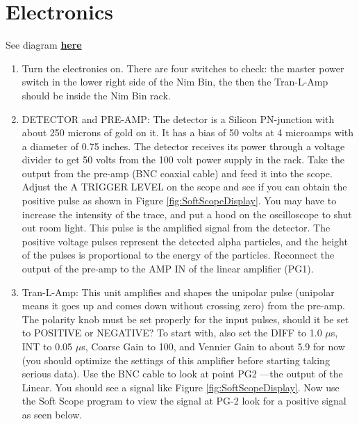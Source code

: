 \documentclass{../lab}
\begin{document}
\section{Electronics}

See diagram \href{http://physics111.lib.berkeley.edu/Physics111/Reprints/RUT/RUT_Positive-diagram.JPG}{\textbf{here}}

\begin{enumerate}
    \item Turn the electronics on. There are four switches to check: the master power switch in the lower right side of the Nim Bin, the then the Tran-L-Amp should be inside the Nim Bin rack.

    \item DETECTOR and PRE-AMP: The detector is a Silicon PN-junction with about 250 microns of gold on it. It has a bias of 50 volts at 4 microamps with a diameter of 0.75 inches. The detector receives its power through a voltage divider to get 50 volts from the 100 volt power supply in the rack. Take the output from the pre-amp (BNC coaxial cable) and feed it into the scope. Adjust the A TRIGGER LEVEL on the scope and see if you can obtain the positive pulse as shown in Figure \ref{fig:SoftScopeDisplay}. You may have to increase the intensity of the trace, and put a hood on the oscilloscope to shut out room light. This pulse is the amplified signal from the detector. The positive voltage pulses represent the detected alpha particles, and the height of the pulses is proportional to the energy of the particles. Reconnect the output of the pre-amp to the AMP IN of the linear amplifier (PG1).

    \item Tran-L-Amp: This unit amplifies and shapes the unipolar pulse (unipolar means it goes up and comes down without crossing zero) from the pre-amp. The polarity knob must be set properly for the input pulses, should it be set to POSITIVE or NEGATIVE? To start with, also set the DIFF to 1.0 $\mu$s, INT to 0.05 $\mu$s, Coarse Gain to 100, and Vennier Gain to about 5.9 for now (you should optimize the settings of this amplifier before starting taking serious data). Use the BNC cable to look at point PG2 ---the output of the Linear. You should see a signal like Figure \ref{fig:SoftScopeDisplay}. Now use the Soft Scope program to view the signal at PG-2 look for a positive signal as seen below.

\end{enumerate}
\end{document}
